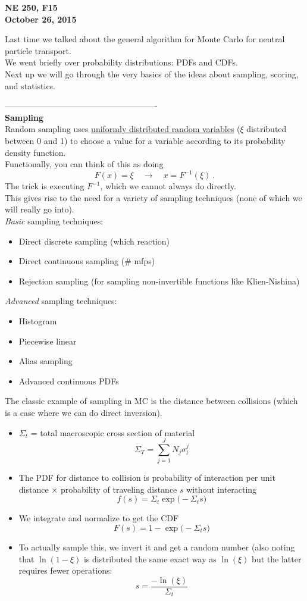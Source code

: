 \documentclass[12pt]{article}
\begin{document}
\begin{center}
{\bf NE 250, F15\\
October 26, 2015 
}
\end{center}

Last time we talked about the general algorithm for Monte Carlo for neutral particle transport. \\
We went briefly over probability distributions: PDFs and CDFs. \\
Next up we will go through the very basics of the ideas about sampling, scoring, and statistics.

-------------------------------------------------------\\
\textbf{Sampling}\\
Random sampling uses \underline{uniformly distributed random variables} ($\xi$ distributed between 0 and 1) to choose a value for a variable according to its probability density function.\\
Functionally, you can think of this as doing
\[
F(x) = \xi \quad \rightarrow \quad x = F^{-1}(\xi)\:.
\]
The trick is executing $F^{-1}$, which we cannot always do directly.\\
This gives rise to the need for a variety of sampling techniques (none of which we will really go into).\\
%
\textit{Basic} sampling techniques:
      \begin{itemize}
      \item Direct discrete sampling (which reaction)
      \item Direct continuous sampling (\# mfps)
      \item Rejection sampling (for sampling non-invertible functions like Klien-Nishina)
      \end{itemize}
\textit{Advanced }sampling techniques:
      \begin{itemize}
      \item Histogram
      \item Piecewise linear
      \item Alias sampling
      \item Advanced continuous PDFs
      \end{itemize}
%
The classic example of sampling in MC is the distance between collisions (which is a case where we can do direct inversion).
\begin{itemize}
\item $\Sigma_t$ = total macroscopic cross section of material
\[\Sigma_T = \sum_{j=1}^J N_j \sigma_t^j\]
%
\item The PDF for distance to collision is probability of interaction per unit distance $\times$ probability of traveling distance $s$ without interacting
\[f(s) = \Sigma_t \exp\bigl(-\Sigma_t s \bigr)\]
%
\item We integrate and normalize to get the CDF
\[F(s) = 1 - \exp\bigl(-\Sigma_t s \bigr)\]
%
\item To actually sample this, we invert it and get a random number (also noting that $\ln(1-\xi)$ is distributed the same exact way as $\ln(\xi)$ but the latter requires fewer operations:
\[
s = \frac{-\ln(\xi)}{\Sigma_t}
\]
\end{itemize}
\end{document}

